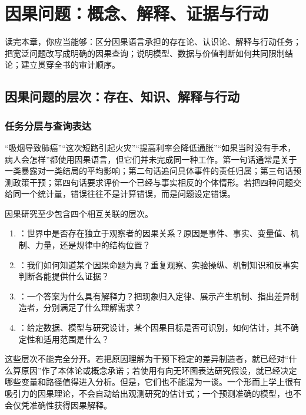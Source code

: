 \chapter{因果问题：概念、解释、证据与行动}
\label{ch:questions}

\begin{learninggoals}
读完本章，你应当能够：区分因果语言承担的存在论、认识论、解释与行动任务；把宽泛问题改写成明确的因果查询；说明模型、数据与价值判断如何共同限制结论；建立贯穿全书的审计顺序。
\end{learninggoals}

\section{因果问题的层次：存在、知识、解释与行动}

\subsection{任务分层与查询表达}

“吸烟导致肺癌”“这次短路引起火灾”“提高利率会降低通胀”“如果当时没有手术，病人会怎样”都使用因果语言，但它们并未完成同一种工作。第一句话通常是关于一类暴露对一类结局的平均影响；第二句话追问具体事件的责任归属；第三句话预测政策干预；第四句话要求评价一个已经与事实相反的个体情形。若把四种问题交给同一个统计量，错误往往不是计算错误，而是问题设定错误。

因果研究至少包含四个相互关联的层次。

\begin{enumerate}
  \item {}：世界中是否存在独立于观察者的因果关系？原因是事件、事实、变量值、机制、力量，还是规律中的结构位置？
  \item {}：我们如何知道某个因果命题为真？重复观察、实验操纵、机制知识和反事实判断各能提供什么证据？
  \item {}：一个答案为什么具有解释力？把现象归入定律、展示产生机制、指出差异制造者，分别满足了什么理解需求？
  \item {}：给定数据、模型与研究设计，某个因果目标是否可识别，如何估计，其不确定性和适用范围是什么？
\end{enumerate}

这些层次不能完全分开。若把原因理解为干预下稳定的差异制造者，就已经对“什么算原因”作了本体论或概念承诺；若使用有向无环图表达研究假设，就已经决定哪些变量和路径值得进入分析。但是，它们也不能混为一谈。一个形而上学上很有吸引力的因果理论，不会自动给出观测研究的估计式；一个预测准确的模型，也不会仅凭准确性获得因果解释。


